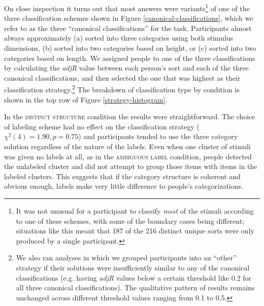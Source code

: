 \documentclass[a4paper, doc]{apa6}
\begin{document}
On close inspection it turns out that most answers were variants\footnote{It was not unusual for a participant to classify {\it most} of the stimuli according to one of these schemes, with some of the boundary cases being different; situations like this meant that 187 of the 216 distinct unique sorts were only produced by a single participant.} of one of the three classification schemes shown in Figure \ref{canonical-classifications}, which we refer to as the three ``canonical classifications'' for the task. Participants almost always approximately (a) sorted into three categories using both stimulus dimensions, (b) sorted into two categories based on height, or (c) sorted into two categories based on length.
We assigned people to one of the three classifications by calculating the {\it adjR} value between each person's sort and each of the three canonical classifications, and then selected the one that was highest as their classification strategy.\footnote{We also ran analyses in which we grouped participants into an ``other'' strategy if their solutions were insufficiently similar to any of the canonical classifications (e.g. having {\it adjR} values below a certain threshold like 0.2 for all three canonical classifications). The qualitative pattern of results remains unchanged across different threshold values ranging from 0.1 to 0.5.}
The breakdown of classification type by condition is shown in the top row of Figure \ref{strategy-histogram}.

In the  \textsc{distinct structure} condition the results were straightforward. The choice of labeling scheme had no effect on the classification strategy (\(\chi^2(4) = 1.90, p = 0.75\)) and participants tended to use the three category solution regardless of the nature of the labels. Even when one cluster of stimuli was given no labels at all, as in the \textsc{ambiguous label} condition, people detected the unlabeled cluster and did not attempt to group those items with items in the labeled clusters. This suggests that if the category structure is coherent and obvious enough, labels make very little difference to people's categorizations.
\end{document}
